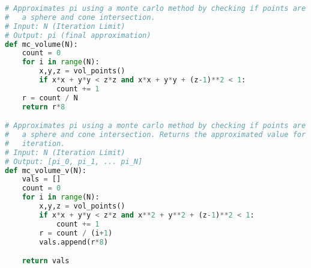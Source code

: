 \documentclass[11pt]{article}
\begin{document}
\begin{lstlisting}[language=Python]
# Approximates pi using a monte carlo method by checking if points are within
#   a sphere and cone intersection.
# Input: N (Iteration Limit)
# Output: pi (final approximation)
def mc_volume(N):
    count = 0
    for i in range(N):
        x,y,z = vol_points()
        if x*x + y*y < z*z and x*x + y*y + (z-1)**2 < 1:
            count += 1
    r = count / N
    return r*8

# Approximates pi using a monte carlo method by checking if points are within
#   a sphere and cone intersection. Returns the approximated value for every
#   iteration.
# Input: N (Iteration Limit)
# Output: [pi_0, pi_1, ... pi_N]
def mc_volume_v(N):
    vals = []
    count = 0
    for i in range(N):
        x,y,z = vol_points()
        if x*x + y*y < z*z and x**2 + y**2 + (z-1)**2 < 1:
            count += 1
        r = count / (i+1) 
        vals.append(r*8)

    return vals
\end{lstlisting}
\end{document}
